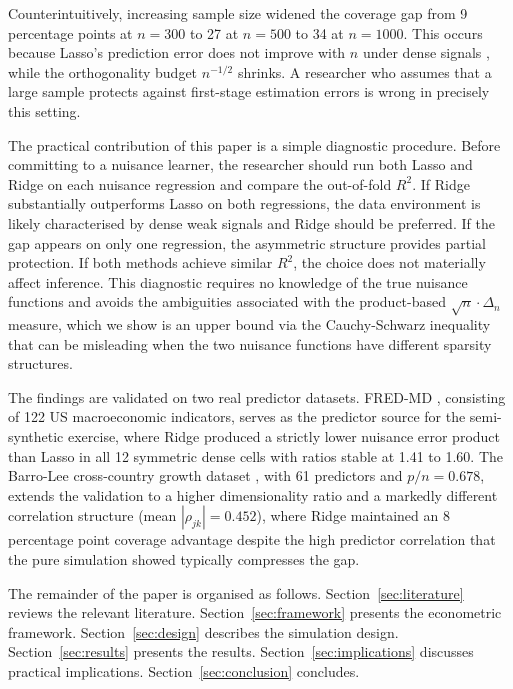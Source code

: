\documentclass[a4paper,10.5pt]{article}
\begin{document}
Counterintuitively, increasing sample size widened the coverage gap from 9 percentage points at $n = 300$ to 27 at $n = 500$ to 34 at $n = 1000$. This occurs because Lasso's prediction error does not improve with $n$ under dense signals \citep{shenxiu2025}, while the orthogonality budget $n^{-1/2}$ shrinks. A researcher who assumes that a large sample protects against first-stage estimation errors is wrong in precisely this setting.

The practical contribution of this paper is a simple diagnostic procedure. Before committing to a nuisance learner, the researcher should run both Lasso and Ridge on each nuisance regression and compare the out-of-fold $R^2$. If Ridge substantially outperforms Lasso on both regressions, the data environment is likely characterised by dense weak signals and Ridge should be preferred. If the gap appears on only one regression, the asymmetric structure provides partial protection. If both methods achieve similar $R^2$, the choice does not materially affect inference. This diagnostic requires no knowledge of the true nuisance functions and avoids the ambiguities associated with the product-based $\sqrt{n}\cdot\Delta_n$ measure, which we show is an upper bound via the Cauchy-Schwarz inequality that can be misleading when the two nuisance functions have different sparsity structures.

The findings are validated on two real predictor datasets. FRED-MD \citep{mccracken2016}, consisting of 122 US macroeconomic indicators, serves as the predictor source for the semi-synthetic exercise, where Ridge produced a strictly lower nuisance error product than Lasso in all 12 symmetric dense cells with ratios stable at 1.41 to 1.60. The Barro-Lee cross-country growth dataset \citep{barro1994}, with 61 predictors and $p/n = 0.678$, extends the validation to a higher dimensionality ratio and a markedly different correlation structure (mean $|\rho_{jk}| = 0.452$), where Ridge maintained an 8 percentage point coverage advantage despite the high predictor correlation that the pure simulation showed typically compresses the gap.

The remainder of the paper is organised as follows. Section~\ref{sec:literature} reviews the relevant literature. Section~\ref{sec:framework} presents the econometric framework. Section~\ref{sec:design} describes the simulation design. Section~\ref{sec:results} presents the results. Section~\ref{sec:implications} discusses practical implications. Section~\ref{sec:conclusion} concludes.
\end{document}
